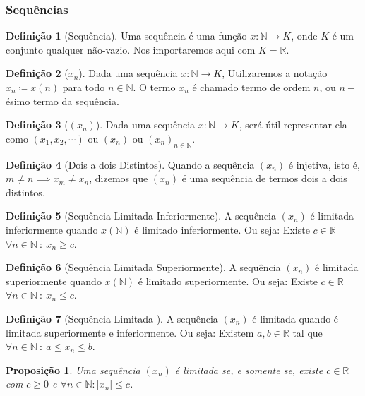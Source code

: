 \documentclass{article}
\theoremstyle{plain}
\newtheorem{prop}{Proposição}[section]
\theoremstyle{definition}
\newtheorem{definicao}{Definição}[section]
\theoremstyle{remark}
\begin{document}
   \subsubsection{ Sequências}
   \begin{definicao}[Sequência]
	   Uma sequência é uma função $x: \mathbb{N} \to K$, onde $K$ é um conjunto qualquer não-vazio. Nos importaremos aqui com $K = \mathbb{R}$. 
   \end{definicao}
   \begin{definicao}[$x_n$]
	   Dada uma sequência $x: \mathbb{N} \to K$, Utilizaremos a notação $x_n \coloneqq x(n)$ para todo $n \in \mathbb{N}$. O termo $x_n$ é chamado termo de ordem $n$, ou $n-$ésimo termo da sequência.
   \end{definicao}
   \begin{definicao}[$(x_n)$]
	   Dada uma sequência $x: \mathbb{N} \to K$, será útil representar ela como $(x_1,x_2,\cdots)$ ou $(x_n)$ ou $(x_n)_{n\in \mathbb{N}}$.
   \end{definicao}
   \begin{definicao}[Dois a dois Distintos]
	   Quando a sequência $(x_n)$ é injetiva, isto é, $m\neq n \implies x_m \neq x_n$, dizemos que $(x_n)$ é uma sequência de termos dois a dois distintos.
   \end{definicao}
   \begin{definicao}[Sequência Limitada Inferiormente]
	   A sequência $(x_n)$ é limitada inferiormente quando $x\left(\mathbb{N}\right)$ é limitado inferiormente. Ou seja: Existe $c \in \mathbb{R}$  $\forall n \in \mathbb{N} \: : \:   x_n \geq c$.
   \end{definicao}
   \begin{definicao}[Sequência Limitada Superiormente]
	   A sequência $(x_n)$ é limitada superiormente quando $x\left(\mathbb{N}\right)$ é limitado superiormente. Ou seja: Existe $c \in \mathbb{R}$  $\forall n \in \mathbb{N} \: : \:   x_n \leq c$.
   \end{definicao}
   \begin{definicao}[Sequência Limitada ]
	   A sequência $(x_n)$ é limitada quando é limitada superiormente e inferiormente. Ou seja: Existem $a,b \in \mathbb{R}$ tal que  $\forall n \in \mathbb{N} \: : \:   a \leq x_n \leq b$.
   \end{definicao}
   \begin{prop}
	   Uma sequência $(x_n)$ é limitada se, e somente se, existe $c\in \mathbb{R}$ com $c\geq 0 $ e $ \forall n \in \mathbb{N} : |x_n| \leq c$.
   \end{prop}
\end{document}
